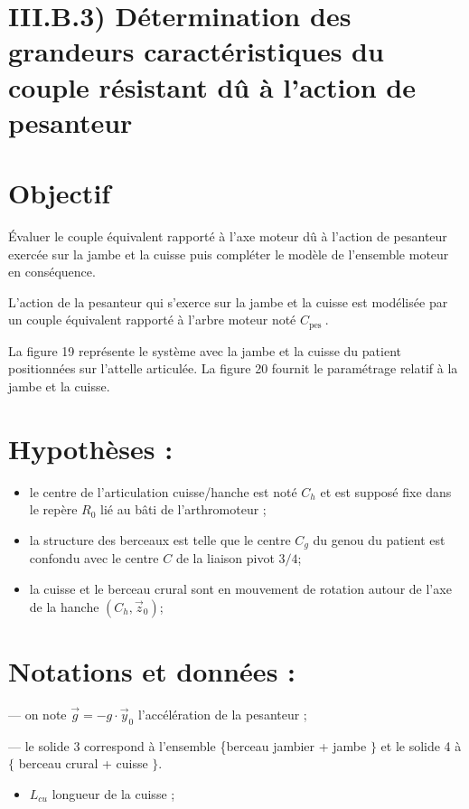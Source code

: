 \documentclass[10pt]{article}
\begin{document}
\section*{III.B.3) Détermination des grandeurs caractéristiques du couple résistant dû à l'action de pesanteur}
\section*{Objectif}
Évaluer le couple équivalent rapporté à l'axe moteur dû à l'action de pesanteur exercée sur la jambe et la cuisse puis compléter le modèle de l'ensemble moteur en conséquence.

L'action de la pesanteur qui s'exerce sur la jambe et la cuisse est modélisée par un couple équivalent rapporté à l'arbre moteur noté $C_{\text {pes }}$.

La figure 19 représente le système avec la jambe et la cuisse du patient positionnées sur l'attelle articulée. La figure 20 fournit le paramétrage relatif à la jambe et la cuisse.

\section*{Hypothèses :}
\begin{itemize}
  \item le centre de l'articulation cuisse/hanche est noté $C_{h}$ et est supposé fixe dans le repère $R_{0}$ lié au bâti de l'arthromoteur ;

  \item la structure des berceaux est telle que le centre $C_{g}$ du genou du patient est confondu avec le centre $C$ de la liaison pivot $3 / 4$;

  \item la cuisse et le berceau crural sont en mouvement de rotation autour de l'axe de la hanche $\left(C_{h}, \vec{z}_{0}\right)$;

\end{itemize}

\section*{Notations et données :}
— on note $\vec{g}=-g \cdot \vec{y}_{0}$ l'accélération de la pesanteur ;

— le solide 3 correspond à l'ensemble \{berceau jambier + jambe $\}$ et le solide 4 à $\{$ berceau crural + cuisse $\}$.

\begin{itemize}
  \item $L_{c u}$ longueur de la cuisse ;
\end{itemize}
\end{document}
